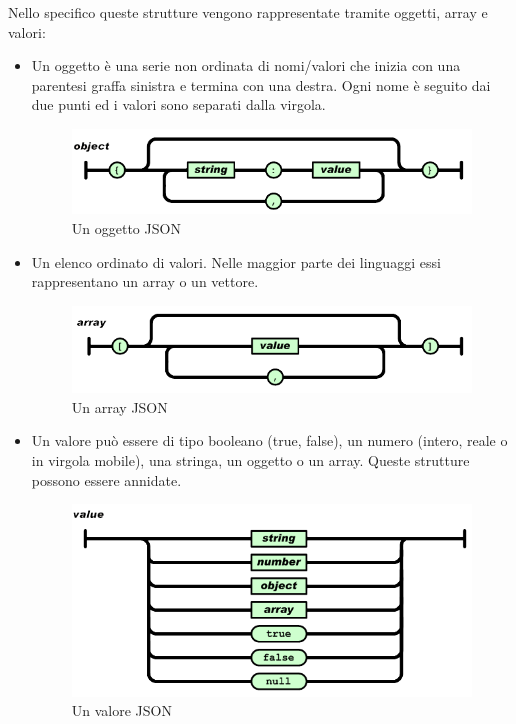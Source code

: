 Nello specifico queste strutture vengono rappresentate tramite oggetti, array e valori:
\begin{itemize}
\item Un oggetto è una serie non ordinata di nomi/valori che inizia con una parentesi graffa sinistra e termina con una destra. Ogni nome è seguito dai due punti ed i valori sono separati dalla virgola.
\begin{figure}[htb]
 \centering
 \includegraphics[width=0.9\linewidth]{images/chapter_architettura_sistema/oggetto_json.png}\hfill
 \caption[Un oggetto JSON]{Un oggetto JSON}
 \label{fig:architettura_sistema_oggetto_json}
\end{figure}
\item Un elenco ordinato di valori. Nelle maggior parte dei linguaggi essi rappresentano un array o un vettore.
\begin{figure}[htb]
 \centering
 \includegraphics[width=0.9\linewidth]{images/chapter_architettura_sistema/array_json.png}\hfill
 \caption[Un array JSON]{Un array JSON}
 \label{fig:architettura_sistema_array_json}
\end{figure}
\item Un valore può essere di tipo booleano (true, false), un numero (intero, reale o in virgola mobile), una stringa, un oggetto o un array. Queste strutture possono essere annidate.
\begin{figure}[htb]
 \centering
 \includegraphics[width=0.8\linewidth]{images/chapter_architettura_sistema/valore_json.png}\hfill
 \caption[Un valore JSON]{Un valore JSON}
 \label{fig:architettura_sistema_valore_json}
\end{figure}

\end{itemize}

